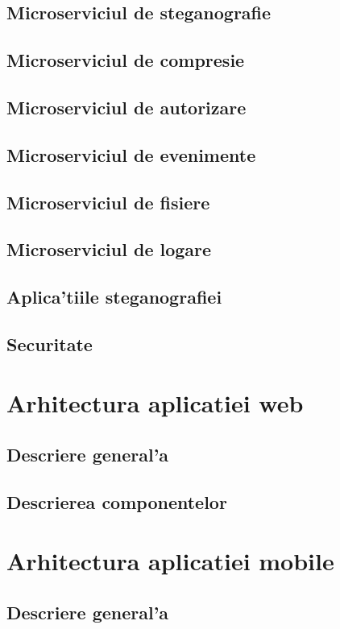 \documentclass[12pt,a4paper,twoside]{report}
\begin{document}
\subsection{Microserviciul de steganografie}
\subsection{Microserviciul de compresie}
\subsection{Microserviciul de autorizare}
\subsection{Microserviciul de evenimente}
\subsection{Microserviciul de fisiere}
\subsection{Microserviciul de logare}

\subsection{Aplica'tiile steganografiei}
\subsection{Securitate}

\section{Arhitectura aplicatiei web}
\subsection{Descriere general'a}
\subsection{Descrierea componentelor}

\section{Arhitectura aplicatiei mobile}
\subsection{Descriere general'a}
\end{document}
